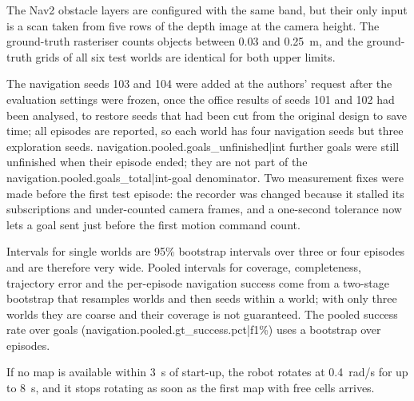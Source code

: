 The Nav2 obstacle layers are configured with the same band, but their only input is a scan taken from five rows of the depth image at the camera height. The ground-truth rasteriser counts objects between 0.03 and 0.25~m, and the ground-truth grids of all six test worlds are identical for both upper limits.

The navigation seeds 103 and 104 were added at the authors' request after the evaluation settings were frozen, once the office results of seeds 101 and 102 had been analysed, to restore seeds that had been cut from the original design to save time; all episodes are reported, so each world has four navigation seeds but three exploration seeds. {{navigation.pooled.goals_unfinished|int}} further goals were still unfinished when their episode ended; they are not part of the {{navigation.pooled.goals_total|int}}-goal denominator. Two measurement fixes were made before the first test episode: the recorder was changed because it stalled its subscriptions and under-counted camera frames, and a one-second tolerance now lets a goal sent just before the first motion command count.

Intervals for single worlds are 95\% bootstrap intervals over three or four episodes and are therefore very wide. Pooled intervals for coverage, completeness, trajectory error and the per-episode navigation success come from a two-stage bootstrap that resamples worlds and then seeds within a world; with only three worlds they are coarse and their coverage is not guaranteed. The pooled success rate over goals ({{navigation.pooled.gt_success.pct|f1}}\%) uses a bootstrap over episodes.

If no map is available within 3~s of start-up, the robot rotates at 0.4~rad/s for up to 8~s, and it stops rotating as soon as the first map with free cells arrives.
